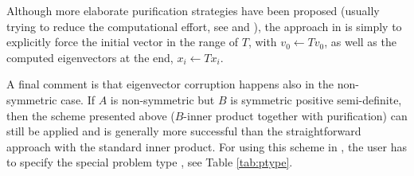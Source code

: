 Although more elaborate purification strategies have been proposed (usually trying to reduce the computational effort, see \citep{Nour-Omid:1987:HIS} and \citep{Meerbergen:1997:IRA}), the approach in \slepc is simply to explicitly force the initial vector in the range of $T$, with $v_0\leftarrow Tv_0$, as well as the computed eigenvectors at the end, $x_i\leftarrow Tx_i$.

A final comment is that eigenvector corruption happens also in the non-symmetric case. If $A$ is non-symmetric but $B$ is symmetric positive semi-definite, then the scheme presented above ($B$-inner product together with purification) can still be applied and is generally more successful than the straightforward approach with the standard inner product. For using this scheme in \slepc, the user has to specify the special problem type , see Table \ref{tab:ptype}.

